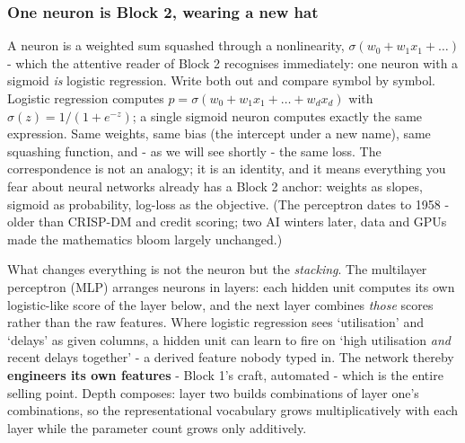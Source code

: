 \documentclass[11pt,a4paper]{article}
\begin{document}
\subsubsection{One neuron is Block 2, wearing a new hat}
A neuron is a weighted sum squashed through a nonlinearity,
$\sigma(w_0 + w_1 x_1 + \dots)$ - which the attentive reader of Block 2
recognises immediately: one neuron with a sigmoid \emph{is} logistic
regression. Write both out and compare symbol by symbol. Logistic
regression computes $p = \sigma(w_0 + w_1 x_1 + \dots + w_d x_d)$ with
$\sigma(z) = 1/(1+e^{-z})$; a single sigmoid neuron computes exactly the
same expression. Same weights, same bias (the intercept under a new
name), same squashing function, and - as we will see shortly - the same
loss. The correspondence is not an analogy; it is an identity, and it
means everything you fear about neural networks already has a Block 2
anchor: weights as slopes, sigmoid as probability, log-loss as the
objective.
(The perceptron dates to 1958 - older than CRISP-DM and credit scoring;
two AI winters later, data and GPUs made the mathematics bloom largely
unchanged.)

What changes everything is not the neuron but the \emph{stacking}. The
multilayer perceptron (MLP) arranges neurons in layers: each hidden unit
computes its own logistic-like score of the layer below, and the next
layer combines \emph{those} scores rather than the raw features. Where
logistic regression sees `utilisation' and `delays' as given columns, a
hidden unit can learn to fire on `high utilisation \emph{and} recent
delays together' - a derived feature nobody typed in. The network
thereby \textbf{engineers its own features} - Block 1's craft, automated
- which is the entire selling point. Depth composes: layer two builds
combinations of layer one's combinations, so the representational
vocabulary grows multiplicatively with each layer while the parameter
count grows only additively.
\end{document}
